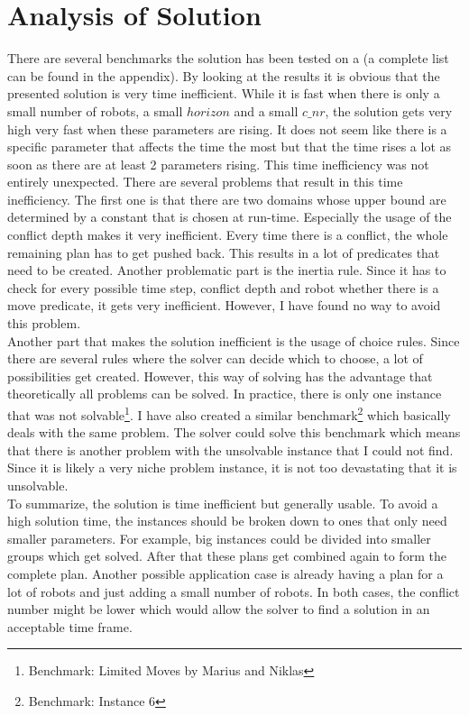 \documentclass[runningheads]{llncs}
\begin{document}
\section{Analysis of Solution}
There are several benchmarks the solution has been tested on a (a complete list can be found in the appendix). By looking at the results it is obvious that the presented solution is very time inefficient. While it is fast when there is only a small number of robots, a small $horizon$ and a small $c\_nr$, the solution gets very high very fast when these parameters are rising. It does not seem like there is a specific parameter that affects the time the most but that the time rises a lot as soon as there are at least 2 parameters rising. This time inefficiency was not entirely unexpected. There are several problems that result in this time inefficiency. The first one is that there are two domains whose upper bound are determined by a constant that is chosen at run-time. Especially the usage of the conflict depth makes it very inefficient. Every time there is a conflict, the whole remaining plan has to get pushed back. This results in a lot of predicates that need to be created. Another problematic part is the inertia rule. Since it has to check for every possible time step, conflict depth and robot whether there is a move predicate, it gets very inefficient. However, I have found no way to avoid this problem. \\
Another part that makes the solution inefficient is the usage of choice rules. Since there are several rules where the solver can decide which to choose, a lot of possibilities get created. However, this way of solving has the advantage that theoretically all problems can be solved. In practice, there is only one instance that was not solvable\footnote{Benchmark: Limited Moves by Marius and Niklas}. I have also created a similar benchmark\footnote{Benchmark: Instance 6} which basically deals with the same problem. The solver could solve this benchmark which means that there is another problem with the unsolvable instance that I could not find. Since it is likely a very niche problem instance, it is not too devastating that it is unsolvable. \\
To summarize, the solution is time inefficient but generally usable. To avoid a high solution time, the instances should be broken down to ones that only need smaller parameters. For example, big instances could be divided into smaller groups which get solved. After that these plans get combined again to form the complete plan. Another possible application case is already having a plan for a lot of robots and just adding a small number of robots. In both cases, the conflict number might be lower which would allow the solver to find a solution in an acceptable time frame.
\end{document}

